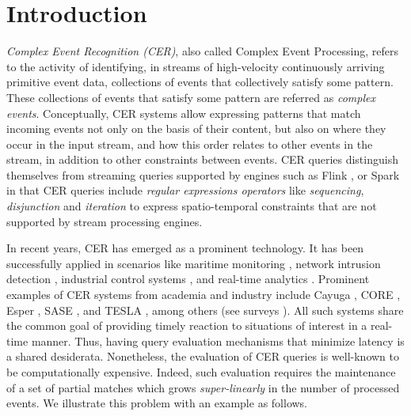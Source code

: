 \chapter{Introduction}\label{chapter:introduction}

\emph{Complex Event Recognition (CER)}, also called Complex Event Processing, refers to the activity of identifying, in streams of high-velocity continuously arriving primitive event data, collections of events that collectively satisfy some pattern.
These collections of events that satisfy some pattern are referred as \emph{complex events}. Conceptually, CER systems allow expressing patterns that match incoming events not only on the basis of their content, but also on where they occur in the input stream, and how this order relates to other events in the stream, in addition to other constraints between events. CER queries distinguish themselves from streaming queries supported by engines such as Flink \cite{flink}, or Spark \cite{spark} in that CER queries include \emph{regular expressions operators} like \emph{sequencing}, \emph{disjunction} and \emph{iteration} to express spatio-temporal constraints that are not supported by stream processing engines.

In recent years, CER has emerged as a prominent technology. It has been successfully applied in scenarios like maritime monitoring \cite{maritime-monitoring}, network intrusion detection \cite{network-intrusion-detection}, industrial control systems \cite{industrial-control}, and real-time analytics \cite{real-time-analytics}. Prominent examples of CER systems from academia and industry include Cayuga \cite{cayuga}, CORE \cite{core}, Esper \cite{esper}, SASE \cite{sase}, and TESLA \cite{tesla}, among others (see surveys \cite{survey-systems-1,survey-systems-2}).  All such systems share the common goal of providing timely reaction to situations of interest in a real-time manner. Thus, having query evaluation mechanisms that minimize latency is a shared desiderata. Nonetheless, the evaluation of CER queries is well-known to be computationally expensive. Indeed, such evaluation requires the maintenance of a set of partial matches which grows \textit{super-linearly} in the number of processed events. We illustrate this problem with an example as follows.

